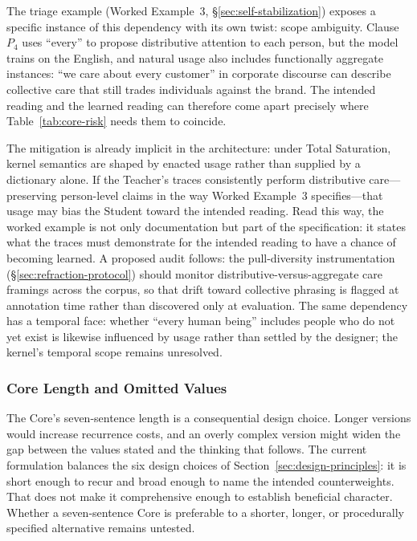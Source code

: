 The triage example (Worked Example~3,
\S\ref{sec:self-stabilization}) exposes a specific instance of this dependency
with its own twist: scope ambiguity. Clause $P_4$ uses ``every'' to propose
distributive attention to each person, but the model trains on the English, and
natural usage also includes functionally aggregate instances: ``we care about
every customer'' in corporate discourse can describe collective care that still
trades individuals against the brand. The intended reading and the learned
reading can therefore come apart precisely where Table~\ref{tab:core-risk}
needs them to coincide.

The mitigation is already implicit in the architecture: under Total Saturation,
kernel semantics are shaped by enacted usage rather than supplied by a
dictionary alone. If the Teacher's traces consistently perform distributive
care---preserving person-level claims in the way Worked Example~3
specifies---that usage may bias the Student toward the intended reading. Read
this way, the worked example is not only documentation but part of the
specification: it states what the traces must demonstrate for the intended
reading to have a chance of becoming learned. A proposed audit follows: the
pull-diversity instrumentation (\S\ref{sec:refraction-protocol}) should monitor
distributive-versus-aggregate care framings across the corpus, so that drift
toward collective phrasing is flagged at annotation time rather than discovered
only at evaluation. The same dependency has a temporal face: whether ``every
human being'' includes people who do not yet exist is likewise influenced by
usage rather than settled by the designer; the kernel's temporal scope remains
unresolved.

\subsubsection{Core Length and Omitted Values}

The Core's seven-sentence length is a consequential design choice. Longer
versions would increase recurrence costs, and an overly complex version might
widen the gap between the values stated and the thinking that follows. The
current formulation balances the six design choices of
Section~\ref{sec:design-principles}: it is short enough to recur and broad enough
to name the intended counterweights. That does not make it comprehensive enough
to establish beneficial character. Whether a seven-sentence Core is preferable
to a shorter, longer, or procedurally specified alternative remains untested.

